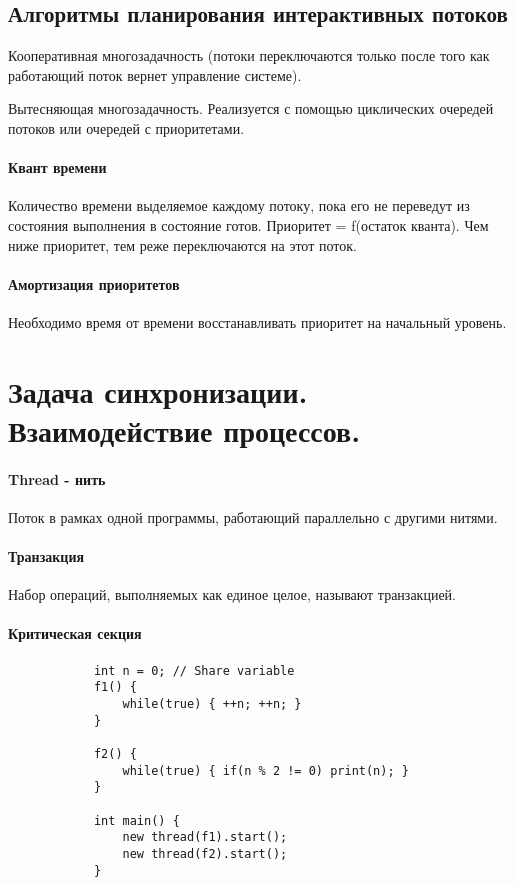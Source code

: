 \documentclass[]{article}
\begin{document}
		\subsection{Алгоритмы планирования интерактивных потоков}
			Кооперативная многозадачность (потоки переключаются только после того как работающий поток вернет управление системе).
			
			Вытесняющая многозадачность. Реализуется с помощью циклических очередей потоков или очередей с приоритетами.
			
			\paragraph{Квант времени}
				Количество времени выделяемое каждому потоку, пока его не переведут из состояния выполнения в состояние готов. Приоритет = f(остаток кванта). Чем ниже приоритет, тем реже переключаются на этот поток.
				
			\paragraph{Амортизация приоритетов}
			Необходимо время от времени восстанавливать приоритет на начальный уровень.
	
	\section{Задача синхронизации. Взаимодействие процессов.}
		\paragraph{Thread - нить} Поток в рамках одной программы, работающий параллельно с другими нитями.
		\paragraph{Транзакция} Набор операций, выполняемых как единое целое, называют транзакцией.
		\paragraph{Критическая секция}
		\begin{lstlisting}
			int n = 0; // Share variable
			f1() {
				while(true) { ++n; ++n; }
			}
			
			f2() {
				while(true) { if(n % 2 != 0) print(n); }
			}
			
			int main() {
				new thread(f1).start();
				new thread(f2).start(); 
			}
		\end{lstlisting}
		
\end{document}

